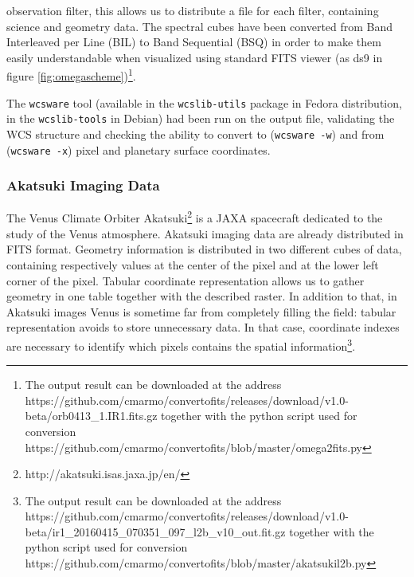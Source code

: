  observation filter, this allows
us to distribute a file for each filter, containing science and geometry data.
The spectral cubes have been converted from Band Interleaved per Line (BIL) to Band
Sequential (BSQ) in order to make them easily understandable when visualized using
standard FITS viewer (as ds9 in figure \ref{fig:omegascheme})\footnote{The output result can be downloaded at the address https://github.com/cmarmo/convertofits/releases/download/v1.0-beta/orb0413\_1.IR1.fits.gz together with the python script used for conversion https://github.com/cmarmo/convertofits/blob/master/omega2fits.py}.

The \texttt{wcsware} tool (available in the \texttt{wcslib-utils} package in Fedora
distribution, in the \texttt{wcslib-tools} in Debian) had been run on the output file,
validating the WCS structure and checking the ability to convert to
(\texttt{wcsware -w}) and from (\texttt{wcsware -x}) pixel and planetary surface
coordinates.

\subsubsection{Akatsuki Imaging Data}
The Venus Climate Orbiter Akatsuki\footnote{http://akatsuki.isas.jaxa.jp/en/} is a JAXA
spacecraft dedicated to the study of the Venus atmosphere.
Akatsuki imaging data are already distributed in FITS format.
Geometry information is distributed in two different cubes of data, containing
respectively values at the center of the pixel and at the lower left corner of the
pixel.
Tabular coordinate representation allows us to gather geometry in one table together
with the described raster.
In addition to that, in Akatsuki images Venus is sometime far from completely filling
the field: tabular representation avoids to store unnecessary data. 
In that case, coordinate indexes are necessary to identify which pixels contains the
spatial information\footnote{The output result can be downloaded at the address https://github.com/cmarmo/convertofits/releases/download/v1.0-beta/ir1\_20160415\_070351\_097\_l2b\_v10\_out.fit.gz together with the python script used for conversion https://github.com/cmarmo/convertofits/blob/master/akatsukil2b.py}.

